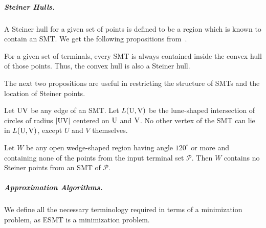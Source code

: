 \subparagraph{Steiner Hulls.}
A Steiner hull for a given set of points is defined to be a region which is known to contain an SMT. We get the following propositions from~\cite{hwang1992steiner}.

\begin{proposition}\label{convex-steiner}
    For a given set of terminals, every SMT is always contained inside the convex hull of those points. Thus, the convex hull is also a Steiner hull.
\end{proposition}

The next two propositions are useful in restricting the structure of SMTs and the location of Steiner points.

\begin{proposition} \label{lune}
    Let $\rm UV$ be any edge of an SMT. Let $L(\rm{U},\rm{V})$ be the lune-shaped intersection of circles of radius $|\rm UV|$ centered on $\rm U$ and $\rm V$. No other vertex of the SMT can lie in $L(\rm{U},\rm{V})$, except $U$ and $V$ themselves.
\end{proposition}

\begin{proposition} \label{wedge}
    Let $W$ be any open wedge-shaped region having angle $120^\circ$ or more and containing none of the points from the input terminal set $\mathcal P$. Then $W$ contains no Steiner points from an SMT of $\mathcal P$.
\end{proposition}

\subparagraph{Approximation Algorithms.}
We define all the necessary terminology required in terms of a minimization problem, as ESMT is a minimization problem.


